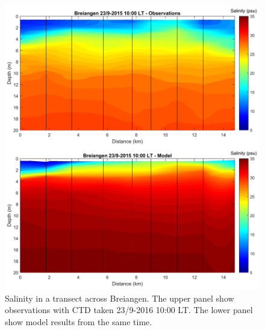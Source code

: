 \documentclass[12pt,a4paper,english]{article}
\begin{document}
\begin{figure}[ht]
\centerline{
\includegraphics*[width=\textwidth]{Figurer/Transect_M_no2_salt.png}}
\caption{\small
Salinity in a transect across Breiangen. 
The upper panel show observations with CTD taken
23/9-2016 10:00 LT. The lower panel show model results from the same time.}
\label{fig:CTD_Mod_M2}
\end{figure}
\end{document}
